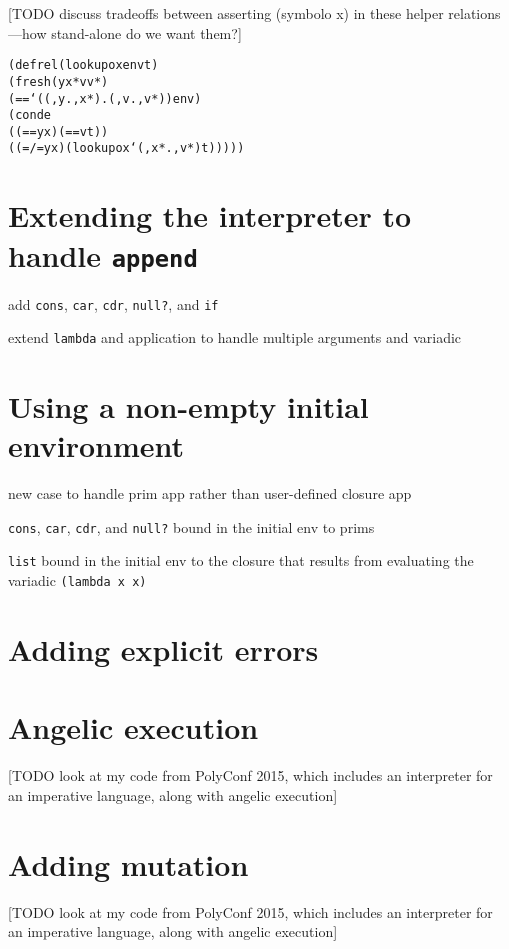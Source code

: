 \documentclass{book}
\begin{document}
[TODO discuss tradeoffs between asserting (symbolo x) in these helper relations---how stand-alone do we want them?]

\begin{alltt}
(defrel (lookupo x env t)
  (fresh (y x* v v*)
    (== `((,y . ,x*) . (,v . ,v*)) env)
    (conde
      ((== y x) (== v t))
      ((=/= y x) (lookupo x `(,x* . ,v*) t)))))
\end{alltt}



\chapter{Extending the interpreter to handle \texttt{append}}%

add \verb|cons|, \verb|car|, \verb|cdr|, \verb|null?|, and \verb|if|

extend \verb|lambda| and application to handle multiple arguments and variadic 


\chapter{Using a non-empty initial environment}%

new case to handle prim app rather than user-defined closure app

\verb|cons|, \verb|car|, \verb|cdr|, and \verb|null?| bound in the initial env to prims

\verb|list| bound in the initial env to the closure that results from evaluating the variadic \verb|(lambda x x)|


\chapter{Adding explicit errors}%


\chapter{Angelic execution}%

[TODO look at my code from PolyConf 2015, which includes an interpreter for an imperative language, along with angelic execution]

\chapter{Adding mutation}%

[TODO look at my code from PolyConf 2015, which includes an interpreter for an imperative language, along with angelic execution]
\end{document}
